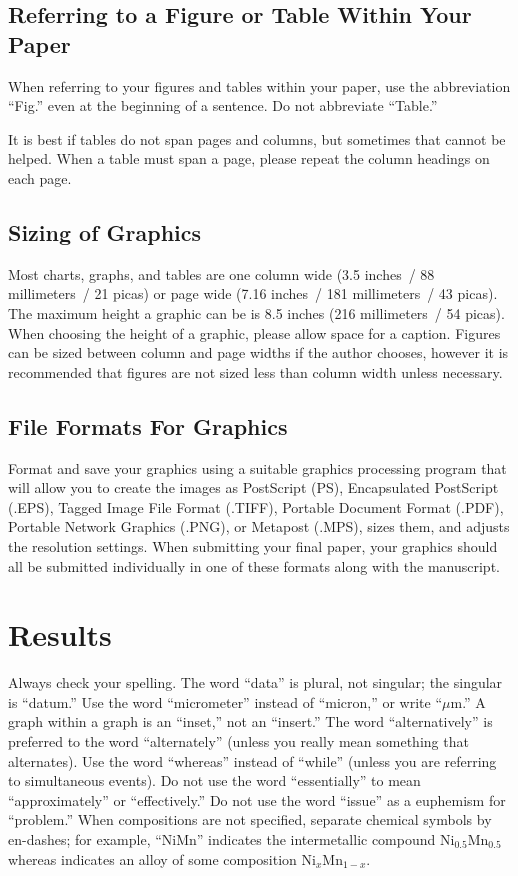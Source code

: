 \documentclass{IEEEtran}
\begin{document}
\subsection{Referring to a Figure or Table Within Your Paper}
\label{subsec:referring}
When referring to your figures and tables within your paper, use the
abbreviation ``Fig.'' even at the beginning of a sentence. Do not abbreviate
``Table.''

It is best if tables do not span pages and columns, but sometimes that
cannot be helped. When a table must span a page, please repeat the column
headings on each page.

\subsection{Sizing of Graphics}
Most charts, graphs, and tables are one column wide (3.5 inches~/ 88
millimeters~/ 21 picas) or page wide (7.16 inches~/ 181 millimeters~/ 43
picas). The maximum height a graphic can be is 8.5 inches (216 millimeters~/
54 picas). When choosing the height of a graphic, please allow space for a
caption. Figures can be sized between column and page widths if the author
chooses, however it is recommended that figures are not sized less than
column width unless necessary.

\subsection{File Formats For Graphics}\label{formats}
Format and save your graphics using a suitable graphics processing program
that will allow you to create the images as PostScript (PS), Encapsulated
PostScript (.EPS), Tagged Image File Format (.TIFF), Portable Document
Format (.PDF), Portable Network Graphics (.PNG), or Metapost (.MPS), sizes them, and adjusts
the resolution settings. When
submitting your final paper, your graphics should all be submitted
individually in one of these formats along with the manuscript.

\section{Results}
Always check your spelling. The word ``data'' is plural, not singular; the
singular is ``datum.'' Use the word ``micrometer'' instead of ``micron,'' or
write ``$\mu $m.'' A graph within a graph is an ``inset,'' not an
``insert.'' The word ``alternatively'' is preferred to the word
``alternately'' (unless you really mean something that alternates). Use the
word ``whereas'' instead of ``while'' (unless you are referring to
simultaneous events). Do not use the word ``essentially'' to mean
``approximately'' or ``effectively.'' Do not use the word ``issue'' as a
euphemism for ``problem.'' When compositions are not specified, separate
chemical symbols by en-dashes; for example, ``NiMn'' indicates the intermetallic
compound Ni$_{0.5}$Mn$_{0.5}$ whereas  indicates an alloy of some
composition Ni$_{x}$Mn$_{1-x}$.
\end{document}
